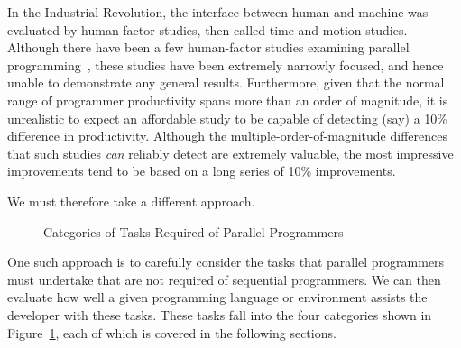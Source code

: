 In the Industrial Revolution, the interface between human and machine
was evaluated by human-factor studies, then called time-and-motion
studies.
Although there have been a few human-factor studies examining parallel
programming~\cite{RyanEccles2005HPCSNovice,RyanEccles2006HPCSNoviceNeeds,
LorinHochstein2005SC,DuaneSzafron1994PEMPDS}, these studies have
been extremely narrowly focused, and hence unable to demonstrate any
general results.
Furthermore, given that the normal range of programmer productivity
spans more than an order of magnitude, it is unrealistic to expect
an affordable study to be capable of detecting (say) a 10\% difference
in productivity.
Although the multiple-order-of-magnitude differences that such studies
\emph{can} reliably detect are extremely valuable, the most impressive
improvements tend to be based on a long series of 10\% improvements.

We must therefore take a different approach.

\begin{figure}[tb]
\begin{center}
\end{center}
\caption{Categories of Tasks Required of Parallel Programmers}
\label{fig:intro:Categories of Tasks Required of Parallel Programmers}
\end{figure}

One such approach is to carefully consider the tasks that parallel
programmers must undertake that are not required of sequential programmers.
We can then evaluate how well a given programming language or environment
assists the developer with these tasks.
These tasks fall into the four categories shown in
Figure~\ref{fig:intro:Categories of Tasks Required of Parallel Programmers},
each of which is covered in the following sections.


